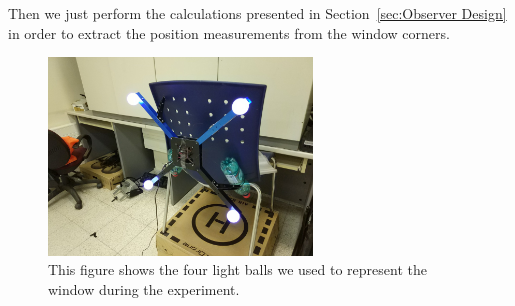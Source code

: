 \documentclass[ twoside, 12pt ]{article}
\begin{document}
Then we just perform the calculations presented in Section~\ref{sec:Observer Design} in order to extract the position measurements from the window corners.

\begin{figure} %
    \centerline{\includegraphics[width=70mm]{window_lights.jpg}}
    \caption{This figure shows the four light balls we used to represent the window during the experiment.}
    \label{fig:window_lights}
\end{figure}
\end{document}
